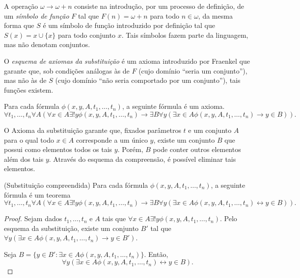 A operação $\omega\rightarrow \omega+n$ consiste na introdução, por um processo de definição, de um \emph{símbolo de função} $F$ tal que $F(n)=\omega+n$ para todo $n\in \omega$, da mesma forma que $S$ é um símbolo de função introduzido por definição tal que $S(x)=x\cup\{x\}$ para todo conjunto $x$.
Tais símbolos fazem parte da linguagem, mas não denotam conjuntos.

O \emph{esquema de axiomas da substituição} é um axioma introduzido por Fraenkel que garante que, sob condições análogas às de $F$ (cujo domínio ``seria um conjunto''), mas não às de $S$ (cujo domínio ``não seria comportado por um conjunto''), tais funções existem.

\begin{axiom}\label{ax:substituicao}
    Para cada fórmula $\phi(x, y, A, t_1, \dots, t_n)$, a seguinte fórmula é um axioma.
    \[
        \forall t_1, \dots, t_n \forall A \left( \forall x\in A \exists! y \phi(x, y, A, t_1, \dots, t_n) \rightarrow \exists B \forall y (\exists x\in A \phi(x, y, A, t_1, \dots, t_n)\rightarrow y \in B)\right).
    \]
\end{axiom}

O Axioma da substituição garante que, fixados parâmetros $t$ e um conjunto $A$ para o qual todo $x\in A$ corresponde a um único $y$, existe um conjunto $B$ que possui como elementos todos os tais $y$.
Porém, $B$ pode conter outros elementos além dos tais $y$.
Através do esquema da compreensão, é possível eliminar tais elementos.
\begin{proposition}[$\ZFmPI$](Substituição compreendida)\label{prop:substituicaoCompreendida}
    Para cada fórmula $\phi(x, y, A, t_1, \dots, t_n)$, a seguinte fórmula é um teorema
    \[
        \forall t_1, \dots, t_n \forall A \left( \forall x\in A \exists! y \phi(x, y, A, t_1, \dots, t_n) \rightarrow \exists B \forall y (\exists x\in A \phi(x, y, A, t_1, \dots, t_n)\leftrightarrow y \in B)\right).
    \]
\end{proposition}
\begin{proof}
    Sejam dados $t_1, \dots, t_n$ e $A$ tais que $\forall x\in A \exists! y \phi(x, y, A, t_1, \dots, t_n)$.
    Pelo esquema da substituição, existe um conjunto $B'$ tal que $\forall y (\exists x\in A \phi(x, y, A, t_1, \dots, t_n)\rightarrow y \in B')$.

    Seja $B=\{y\in B' : \exists x\in A \phi(x, y, A, t_1, \dots, t_n)\}$.
    Então,
    \[
    \forall y (\exists x\in A \phi(x, y, A, t_1, \dots, t_n)\leftrightarrow y \in B).
    \]
\end{proof}

